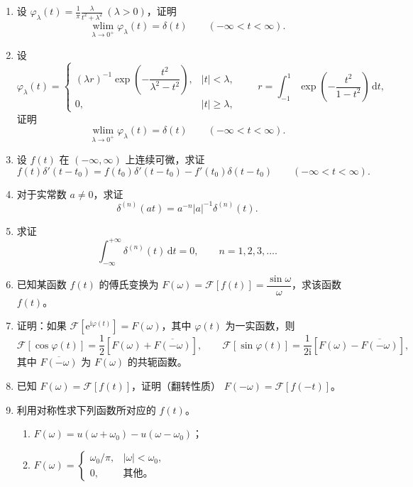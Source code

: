 \documentclass[UTF8,11pt,a4paper]{ctexart}
\newcommand{\dd}{\,\mathrm{d}}
\newcommand{\ee}{\mathrm{e}}
\newcommand{\ii}{\mathrm{i}}
\begin{document}
\begin{enumerate}
\item 设 $\displaystyle\varphi_\lambda(t)=\frac1\pi\frac{\lambda}{t^2+\lambda^2}\ (\lambda>0)$，证明
\[
\underset{\lambda\to0^+}{\operatorname{wlim}}\varphi_\lambda(t)=\delta(t)
\qquad(-\infty<t<\infty).
\]

\item 设
\[
\varphi_\lambda(t)=
\begin{cases}
(\lambda r)^{-1}\exp\!\left(-\dfrac{t^2}{\lambda^2-t^2}\right),&|t|<\lambda,\\
0,&|t|\geqslant\lambda,
\end{cases}
\qquad
r=\int_{-1}^{1}\exp\!\left(-\frac{t^2}{1-t^2}\right)\dd t,
\]
证明
\[
\underset{\lambda\to0^+}{\operatorname{wlim}}\varphi_\lambda(t)=\delta(t)
\qquad(-\infty<t<\infty).
\]

\item 设 $f(t)$ 在 $(-\infty,\infty)$ 上连续可微，求证
\[
f(t)\delta'(t-t_0)=f(t_0)\delta'(t-t_0)-f'(t_0)\delta(t-t_0)
\qquad(-\infty<t<\infty).
\]

\item 对于实常数 $a\ne0$，求证
\[
\delta^{(n)}(at)=a^{-n}|a|^{-1}\delta^{(n)}(t).
\]

\item 求证
\[
\int_{-\infty}^{+\infty}\delta^{(n)}(t)\dd t=0,
\qquad n=1,2,3,\ldots.
\]

\item 已知某函数 $f(t)$ 的傅氏变换为
$\displaystyle F(\omega)=\mathcal F[f(t)]=\dfrac{\sin\omega}{\omega}$，求该函数 $f(t)$。

\item 证明：如果 $\mathcal F[\ee^{\ii\varphi(t)}]=F(\omega)$，其中 $\varphi(t)$ 为一实函数，则
\[
\mathcal F[\cos\varphi(t)]=\frac12\left[F(\omega)+\overline{F(-\omega)}\right],
\qquad
\mathcal F[\sin\varphi(t)]=\frac1{2\ii}\left[F(\omega)-\overline{F(-\omega)}\right],
\]
其中 $\overline{F(-\omega)}$ 为 $F(\omega)$ 的共轭函数。

\item 已知 $F(\omega)=\mathcal F[f(t)]$，证明（翻转性质）
$F(-\omega)=\mathcal F[f(-t)]$。

\item 利用对称性求下列函数所对应的 $f(t)$。
  \begin{enumerate}
  \item $F(\omega)=u(\omega+\omega_0)-u(\omega-\omega_0)$；
  \item $\displaystyle F(\omega)=\begin{cases}\omega_0/\pi,&|\omega|<\omega_0,\\0,&\text{其他。}\end{cases}$
  \end{enumerate}


\end{enumerate}
\end{document}
